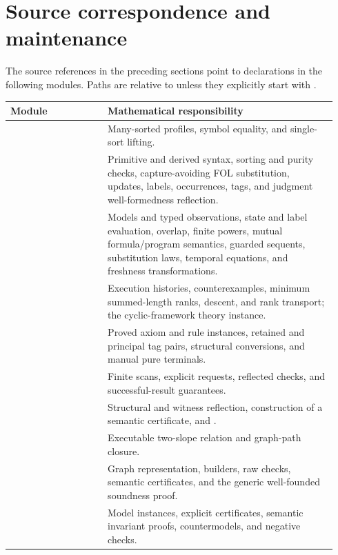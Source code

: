 \section{Source correspondence and maintenance}\label{sec:source-map}

The source references in the preceding sections point to declarations in
the following modules. Paths are relative to  unless
they explicitly start with .
\begin{longtable}{@{}L{0.28\linewidth}L{0.66\linewidth}@{}}
\toprule
Module & Mathematical responsibility\\
\midrule
\endhead
{} & Many-sorted profiles, symbol equality, and single-sort lifting.\\
 & Primitive and derived syntax, sorting and purity checks,
capture-avoiding FOL substitution, updates, labels, occurrences, tags, and
judgment well-formedness reflection.\\
 & Models and typed observations, state and label evaluation,
overlap, finite powers, mutual formula/program semantics, guarded sequents,
substitution laws, temporal equations, and freshness transformations.\\
 & Execution histories, counterexamples, minimum summed-length
ranks, descent, and rank transport; the cyclic-framework theory instance.\\
 & Proved axiom and rule instances, retained and principal tag
pairs, structural conversions, and manual pure terminals.\\
 & Finite scans, explicit requests, reflected checks,
and successful-result guarantees.\\
 & Structural and witness reflection, construction of a
semantic certificate, and .\\
 & Executable two-slope relation and graph-path closure.\\
 & Graph representation, builders, raw checks,
semantic certificates, and the generic well-founded soundness proof.\\
 & Model instances, explicit certificates, semantic invariant
proofs, countermodels, and negative checks.\\
\bottomrule
\end{longtable}

